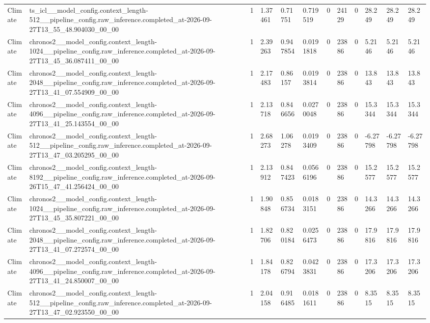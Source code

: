 \begin{tabular}{llllllllllll}
Climate & ts\_icl\_\_model\_config.context\_length-512\_\_pipeline\_config.raw\_inference.completed\_at-2026-09-27T13\_55\_48.904030\_00\_00 & 1 & 1.37461 & 0.71751 & 0.719519 & 0 & 24129 & 0 & 28.249 & 28.249 & 28.249 \\
Climate & chronos2\_\_model\_config.context\_length-1024\_\_pipeline\_config.raw\_inference.completed\_at-2026-09-27T13\_45\_36.087411\_00\_00 & 1 & 2.39263 & 0.947854 & 0.0191818 & 0 & 23886 & 0 & 5.2146 & 5.2146 & 5.2146 \\
Climate & chronos2\_\_model\_config.context\_length-2048\_\_pipeline\_config.raw\_inference.completed\_at-2026-09-27T13\_41\_07.554909\_00\_00 & 1 & 2.17483 & 0.86157 & 0.0193814 & 0 & 23886 & 0 & 13.843 & 13.843 & 13.843 \\
Climate & chronos2\_\_model\_config.context\_length-4096\_\_pipeline\_config.raw\_inference.completed\_at-2026-09-27T13\_41\_25.143554\_00\_00 & 1 & 2.13718 & 0.846656 & 0.0270048 & 0 & 23886 & 0 & 15.3344 & 15.3344 & 15.3344 \\
Climate & chronos2\_\_model\_config.context\_length-512\_\_pipeline\_config.raw\_inference.completed\_at-2026-09-27T13\_47\_03.205295\_00\_00 & 1 & 2.68273 & 1.06278 & 0.0193409 & 0 & 23886 & 0 & -6.27798 & -6.27798 & -6.27798 \\
Climate & chronos2\_\_model\_config.context\_length-8192\_\_pipeline\_config.raw\_inference.completed\_at-2026-09-26T15\_47\_41.256424\_00\_00 & 1 & 2.13912 & 0.847423 & 0.0566196 & 0 & 23886 & 0 & 15.2577 & 15.2577 & 15.2577 \\
Climate & chronos2\_\_model\_config.context\_length-1024\_\_pipeline\_config.raw\_inference.completed\_at-2026-09-27T13\_45\_35.807221\_00\_00 & 1 & 1.90848 & 0.856734 & 0.0183151 & 0 & 23886 & 0 & 14.3266 & 14.3266 & 14.3266 \\
Climate & chronos2\_\_model\_config.context\_length-2048\_\_pipeline\_config.raw\_inference.completed\_at-2026-09-27T13\_41\_07.272574\_00\_00 & 1 & 1.82706 & 0.820184 & 0.0256473 & 0 & 23886 & 0 & 17.9816 & 17.9816 & 17.9816 \\
Climate & chronos2\_\_model\_config.context\_length-4096\_\_pipeline\_config.raw\_inference.completed\_at-2026-09-27T13\_41\_24.850007\_00\_00 & 1 & 1.84178 & 0.826794 & 0.0423831 & 0 & 23886 & 0 & 17.3206 & 17.3206 & 17.3206 \\
Climate & chronos2\_\_model\_config.context\_length-512\_\_pipeline\_config.raw\_inference.completed\_at-2026-09-27T13\_47\_02.923550\_00\_00 & 1 & 2.04158 & 0.916485 & 0.0181611 & 0 & 23886 & 0 & 8.3515 & 8.3515 & 8.3515 \\

\end{tabular}
